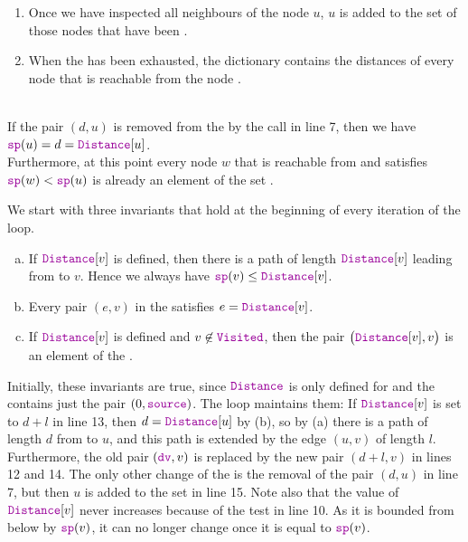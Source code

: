 \begin{enumerate}
      have to update the priority of the node $v$ in the .  The easiest way to do this is to remove
      the old pair $(\mytt{dv}, v)$ from the  and replace this pair by the new pair
      $(d+l, v)$, because $d+l$ is the new estimate of the distance between  and $v$ and
      $d+l$ is the new priority of $v$.
\item Once we have inspected all neighbours of the node $u$, $u$ is added to the set of those nodes that have
      been .
\item When the  has been exhausted, the dictionary  contains the distances of
      every node that is reachable from the node .  
\end{enumerate}

\begin{Theorem} \hspace*{\fill} \\
  If the pair $(d, u)$ is removed from the  by the call  in line 7, then we have
  \\[0.2cm]
  \hspace*{1.3cm}
  $\mytt{sp}(u) = d = \mytt{Distance}[u]$.
  \\[0.2cm]
  Furthermore, at this point every node $w$ that is reachable from  and satisfies
  $\mytt{sp}(w) < \mytt{sp}(u)$ is already an element of the set .
\end{Theorem}

\proof
We start with three invariants that hold at the beginning of every iteration of the  loop.
\begin{enumerate}[(a)]
\item If $\mytt{Distance}[v]$ is defined, then there is a path of length $\mytt{Distance}[v]$ leading from
       to $v$.  Hence we always have $\mytt{sp}(v) \leq \mytt{Distance}[v]$.
\item Every pair $(e, v)$ in the  satisfies $e = \mytt{Distance}[v]$.
\item If $\mytt{Distance}[v]$ is defined and $v \not\in \mytt{Visited}$, then the pair
      $\bigl(\mytt{Distance}[v], v\bigr)$ is an element of the .
\end{enumerate}
Initially, these invariants are true, since $\mytt{Distance}$ is only defined for  and the
 contains just the pair $(0, \mytt{source})$.  The loop maintains them: If
$\mytt{Distance}[v]$ is set to $d + l$ in line 13, then $d = \mytt{Distance}[u]$ by (b), so by (a) there is a
path of length $d$ from  to $u$, and this path is extended by the edge $(u, v)$ of length $l$.
Furthermore, the old pair $(\mytt{dv}, v)$ is replaced by the new pair $(d + l, v)$ in lines 12 and 14.
The only other change of the  is the removal of the pair $(d, u)$ in line 7, but then $u$ is
added to the set  in line 15.  Note also that the value of $\mytt{Distance}[v]$ never
increases because of the test in line 10.  As it is bounded from below by $\mytt{sp}(v)$, it can no longer
change once it is equal to $\mytt{sp}(v)$.

